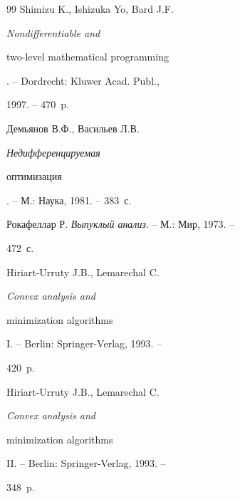 \begin{thebibliography}{99}
Shimizu K., Ishizuka Yo, Bard J.F. {\it Nondifferentiable and


two-level mathematical programming}. -- Dordrecht: Kluwer Acad. Publ.,


1997. -- 470~p.







Демьянов В.Ф., Васильев Л.В. {\it Недифференцируемая


оптимизация}. -- М.: Наука, 1981. -- 383~с.







Рокафеллар Р. {\it Выпуклый анализ}. -- М.: Мир, 1973. --


472~с.







Hiriart-Urruty J.B., Lemarechal C. {\it Convex analysis and


minimization algorithms} I. -- Berlin: Springer-Verlag, 1993. --


420~p.







Hiriart-Urruty J.B., Lemarechal C. {\it Convex analysis and


minimization algorithms} II. -- Berlin: Springer-Verlag, 1993. --


348~p.





\end{thebibliography}





\vskip 2cm














\label{end}





 























